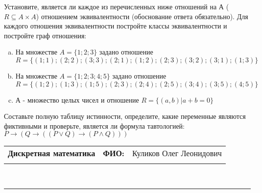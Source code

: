 \documentclass[10pt]{exam}
\newcommand{\class}{Дискретная математика}
\newcommand{\examdate}{}
\begin{document}
\begin{questions}
\question
Установите, является ли каждое из перечисленных ниже отношений на А ($R \subseteq A \times A$) отношением эквивалентности (обоснование ответа обязательно). Для каждого отношения эквивалентности постройте классы 
эквивалентности и постройте граф отношения:
\begin{enumerate} [a)]\setcounter{enumi}{0}
\item На множестве $A = \{1; 2; 3\}$ задано отношение $R = \{(1; 1); (2; 2); (3; 3); (2; 1); (1; 2); (2; 3); (3; 2); (3; 1); (1; 3)\}$
\item На множестве $A = \{1; 2; 3; 4; 5\}$ задано отношение $R = \{(1; 2); (1; 3); (1; 5); (2; 3); (2; 4); (2; 5); (3; 4); (3; 5); (4; 5)\}$
\item А - множество целых чисел и отношение $R = \{(a,b)|a + b = 0\}$
\end{enumerate}\question Составьте полную таблицу истинности, определите, какие переменные являются фиктивными и проверьте, является ли формула тавтологией:
$ P \rightarrow (Q \rightarrow ((P \lor Q) \rightarrow (P \land Q)))$

\end{questions}
\newpage
\begin{flushright}
\begin{tabular}{p{2.8in} r l}
\textbf{\class} & \textbf{ФИО:} &Куликов Олег Леонидович
\\

\textbf{\examdate} &&\\
\end{tabular}\\
\end{flushright}
\rule[1ex]{\textwidth}{.1pt}
\end{document}
